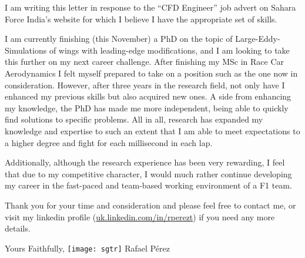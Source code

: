 \documentclass[10pt,stdletter,dateno,sigleft]{newlfm} %
\begin{document}
\begin{newlfm}


I am writing this letter in response to the ``CFD Engineer'' job advert on Sahara Force
India's website for which I believe I have the appropriate set of skills. 

I am currently finishing (this November) a PhD on the topic of Large-Eddy-Simulations of
wings with leading-edge modifications, and I am looking to take this further on my next
career challenge. After finishing my MSc in Race Car Aerodynamics I felt myself prepared to take
on a position such as the one now in consideration. However, after three years in the
research field, not only have I enhanced my previous skills but also acquired new
ones. A side from enhancing my knowledge, the PhD has made me more independent, being able
to quickly find solutions to specific problems. All in all, research has expanded my
knowledge and expertise to such an extent that I am able to meet expectations to a higher
degree and fight for each millisecond in each lap.

Additionally, although the research experience has been very rewarding, I feel that due to
my competitive character, I would much rather continue developing my career in the
fast-paced and team-based working environment of a F1 team.

Thank you for your time and consideration and please feel free to contact me, or visit my
linkedin profile (\href{https://uk.linkedin.com/in/rperezt}{uk.linkedin.com/in/rperezt})
if you need any more details.

Yours Faithfully, \newline %
\texttt{[image: sgtr]} \newline 
Rafael P\'erez


\end{newlfm}
\end{document}
